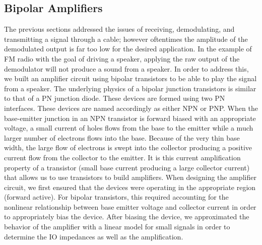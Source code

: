 \documentclass[11pt]{article}
\begin{document}
  \subsection{Bipolar Amplifiers}
  The previous sections addressed the issues of receiving, demodulating, and transmitting a signal through a cable; however oftentimes the amplitude of the demodulated output is far too low for the desired application. In the example of FM radio with the goal of driving a speaker, applying the raw output of the demodulator will not produce a sound from a speaker. In order to address this, we built an amplifier circuit using bipolar transistors to be able to play the signal from a speaker.
  The underlying physics of a bipolar junction transistors is similar to that of a PN junction diode. These devices are formed using two PN interfaces.  These devices are named accordingly as either NPN or PNP.  When the base-emitter junction in an NPN transistor is forward biased with an appropriate voltage, a small current of holes flows from the base to the emitter while a much larger number of electrons flows into the base.  Because of the very thin base width, the large flow of electrons is swept into the collector producing a positive current flow from the collector to the emitter. It is this current amplification property of a transistor (small base current producing a large collector current) that allows us to use transistors to build amplifiers.
  When designing the amplifier circuit, we first ensured that the devices were operating in the appropriate region (forward active).  For bipolar transistors, this required accounting for the nonlinear relationship between base emitter voltage and collector current in order to appropriately bias the device.  After biasing the device, we approximated the behavior of the amplifier with a linear model for small signals in order to determine the IO impedances as well as the amplification.
  
\end{document}
